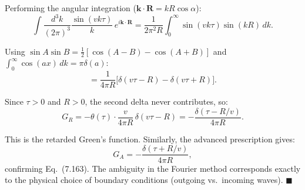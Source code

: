 \documentclass[12pt]{article}
\begin{document}
Performing the angular integration ($\mathbf{k}\cdot\mathbf{R} = kR\cos\alpha$):
\[
\int\frac{d^3k}{(2\pi)^3}\frac{\sin(vk\tau)}{k}\,e^{i\mathbf{k}\cdot\mathbf{R}} = \frac{1}{2\pi^2 R}\int_0^{\infty}\sin(vk\tau)\sin(kR)\,dk.
\]

Using $\sin A\sin B = \frac{1}{2}[\cos(A-B)-\cos(A+B)]$ and $\int_0^\infty\cos(ax)\,dk = \pi\delta(a)$:
\[
= \frac{1}{4\pi R}\bigl[\delta(v\tau - R) - \delta(v\tau + R)\bigr].
\]

Since $\tau > 0$ and $R > 0$, the second delta never contributes, so:
\[
G_R = -\theta(\tau)\cdot\frac{v}{4\pi R}\,\delta(v\tau - R) = -\frac{\delta(\tau - R/v)}{4\pi R}.
\]

This is the retarded Green's function. Similarly, the advanced prescription gives:
\[
G_A = -\frac{\delta(\tau + R/v)}{4\pi R},
\]
confirming Eq.\ (7.163). The ambiguity in the Fourier method corresponds exactly to the physical choice of boundary conditions (outgoing vs.\ incoming waves). $\blacksquare$
\end{document}
